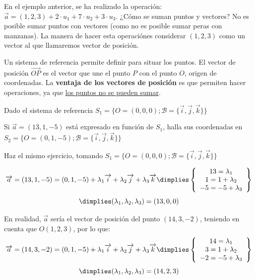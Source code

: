 \obs En el ejemplo anterior, se ha realizado la operación: $\vec{a} =  (1,2,3) + 2·u_1 + 7·u_2 + 3·u_3$. ¿Cómo se suman puntos y vectores? 
%
No es posible sumar puntos con vectores (como no es posible sumar peras con manzanas). La manera de hacer esta operaciónes considerar $(1,2,3)$ como un vector al que llamaremos vector de posición.


Un sistema de referencia permite definir  para situar los puntos.
%
El vector de posición $\vec{OP}$ es el vector que une el punto $P$ con el punto $O$, origen de coordenadas. 
%
La \textbf{ventaja de los vectores de posición} es que permiten hacer operaciones, ya que \ul{los puntos no se pueden sumar}.



\begin{problem}

Dado el sistema de referencia $S_1=\{O = (0,0,0); \mathcal{B} = \{\vec{i},\vec{j},\vec{k}\}\}$

\ppart Si $\vec{a} = (13,1,-5)$ está expresado en función de $S_1$, halla sus coordenadas en $S_2=\{O = (0,1,-5); \mathcal{B} = \{\vec{i},\vec{j},\vec{k}\}\}$

\ppart Haz el mismo ejercicio, tomando $S_1=\{O = (0,0,0); \mathcal{B} = \{\vec{i},\vec{j},\vec{k}\}\}$

\solution

\spart 
\[
  \vec{a} = (13,1,-5) = (0,1,-5) + \lambda_1\vec{i} + \lambda_2\vec{j} + \lambda_3\vec{k} \dimplies \left\{
    \begin{array}{c}
      13 = \lambda_1\\
      1 = 1 + \lambda_2\\
      -5 = -5 + \lambda_3
    \end{array}
  \right\} \]
\[\dimplies (\lambda_1,\lambda_2,\lambda_3) = (13,0,0)
\]

\spart 
En realidad, $\vec{a}$ sería el vector de posición del punto $(14,3,-2)$, teniendo en cuenta que $O(1,2,3)$, por lo que:
\[
  \vec{a} = (14,3,-2) = (0,1,-5) + \lambda_1\vec{i} + \lambda_2\vec{j} + \lambda_3\vec{k} \dimplies \left\{
    \begin{array}{c}
      14 = \lambda_1\\
      3 = 1 + \lambda_2\\
      -2 = -5 + \lambda_3
    \end{array}
  \right\} \]
\[\dimplies (\lambda_1,\lambda_2,\lambda_3) = (14,2,3)
\]



\end{problem}


